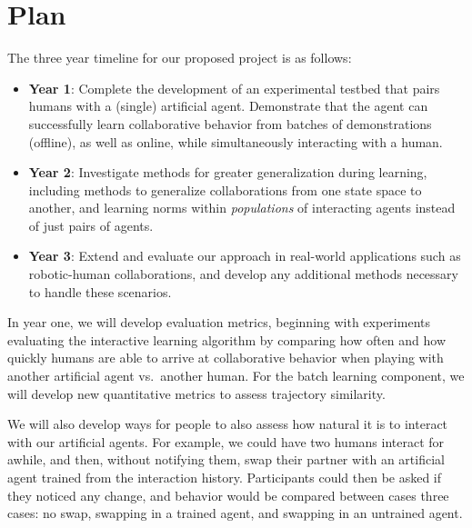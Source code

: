 
\section{Plan}
The three year timeline for our proposed project is as follows:

\begin{itemize}
\item {\bf Year 1}: Complete the development of an experimental
  testbed that pairs humans with a (single) artificial agent.
  Demonstrate that the agent can successfully learn collaborative
  behavior from batches of demonstrations (offline), as well as
  online, while simultaneously interacting with a human.

\item {\bf Year 2}: Investigate methods for greater generalization
  during learning, including methods to generalize collaborations from
  one state space to another, and learning norms within {\em
    populations\/} of interacting agents instead of just pairs of
  agents.

\item {\bf Year 3}: Extend and evaluate our approach in real-world
  applications such as robotic-human
  collaborations, and develop any additional
  methods necessary to handle these scenarios.
\end{itemize}

In year one, we will develop evaluation metrics, beginning with
experiments evaluating the interactive learning algorithm by comparing
how often and how quickly humans are able to arrive at collaborative behavior
when playing with another artificial agent vs.\ another human.  For
the batch learning component, we will develop new quantitative metrics
to assess trajectory similarity.

We will also develop ways for people to also assess how natural it is
to interact with our artificial agents. For example, we could have two
humans interact for awhile, and then, without notifying them, swap
their partner with an artificial agent trained from the interaction
history. Participants could then be asked if they noticed any change,
and behavior would be compared between cases three cases: no swap,
swapping in a trained agent, and swapping in an untrained agent.

